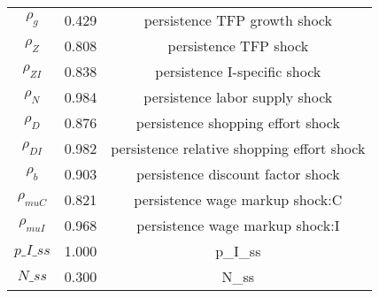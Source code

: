 \begin{center}
\begin{longtable}{ccc}
${\rho_g}$ 	 & 	 0.429 	 & 	 persistence TFP growth shock\\
${\rho_Z}$ 	 & 	 0.808 	 & 	 persistence TFP shock\\
${\rho_{ZI}}$ 	 & 	 0.838 	 & 	 persistence I-specific shock\\
${\rho_N}$ 	 & 	 0.984 	 & 	 persistence labor supply shock\\
${\rho_D}$ 	 & 	 0.876 	 & 	 persistence shopping effort shock\\
${\rho_{DI}}$ 	 & 	 0.982 	 & 	 persistence relative shopping effort shock\\
${\rho_b}$ 	 & 	 0.903 	 & 	 persistence discount factor shock\\
${\rho_{muC}}$ 	 & 	 0.821 	 & 	 persistence wage markup shock:C\\
${\rho_{muI}}$ 	 & 	 0.968 	 & 	 persistence wage markup shock:I\\
$p\_I\_ss$ 	 & 	 1.000 	 & 	 p\_I\_ss\\
$N\_ss$ 	 & 	 0.300 	 & 	 N\_ss\\
\bottomrule%
\end{longtable}
\end{center}
